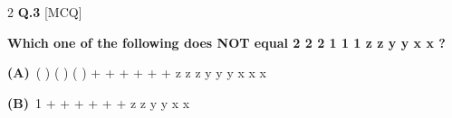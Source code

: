 \documentclass[a4paper,10pt,twoside]{article}
\begin{document}
\begin{multicols}{2}
\noindent\textbf{Q.3} \hfill {\footnotesize\textsf{[MCQ]}}
\par\vspace{2pt}
{\bfseries Which one of the following does NOT equal
2
2
2
1
1
1
z
z
y
y
x
x
? \par}
\par\vspace{2pt}\noindent
\textbf{(A)}~( \newline ) \newline ( \newline ) \newline ( \newline )          \newline + \newline + \newline + \newline + \newline + \newline + \newline z \newline z \newline z \newline y \newline y \newline y \newline x \newline x \newline x\par\vspace{2pt}\noindent
\textbf{(B)}~1            \newline + \newline + \newline + \newline + \newline + \newline + \newline z \newline z \newline y \newline y \newline x \newline x\par\vspace{2pt}\noindent

\end{multicols}
\end{document}

